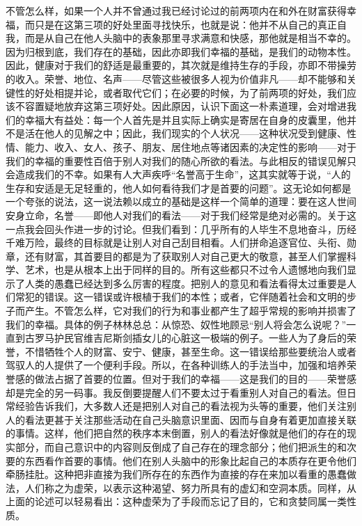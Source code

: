 \documentclass[12pt,oneside]{book}
\begin{document}
不管怎么样，如果一个人并不曾通过我已经讨论过的前两项内在和外在财富获得幸福，而只是在这第三项的好处里面寻找快乐，也就是说：他并不从自己的真正自我，而是从自己在他人头脑中的表象那里寻求满意和快感，那他就是相当不幸的。因为归根到底，我们存在的基础，因此亦即我们幸福的基础，是我们的动物本性。因此，健康对于我们的舒适是最重要的，其次就是维持生存的手段，亦即不带操劳的收入。荣誉、地位、名声——尽管这些被很多人视为价值非凡——却不能够和关键性的好处相提并论，或者取代它们；在必要的时候，为了前两项的好处，我们应该不容置疑地放弃这第三项好处。因此原因，认识下面这一朴素道理，会对增进我们的幸福大有益处：每一个人首先是并且实际上确实是寄居在自身的皮囊里，他并不是活在他人的见解之中；因此，我们现实的个人状况——这种状况受到健康、性情、能力、收入、女人、孩子、朋友、居住地点等诸因素的决定性的影响——对于我们的幸福的重要性百倍于别人对我们的随心所欲的看法。与此相反的错误见解只会造成我们的不幸。如果有人大声疾呼“名誉高于生命”，这其实就等于说，“人的生存和安适是无足轻重的，他人如何看待我们才是首要的问题”。这无论如何都是一个夸张的说法，这一说法赖以成立的基础是这样一个简单的道理：要在这人世间安身立命，名誉——即他人对我们的看法——对于我们经常是绝对必需的。关于这一点我会回头作进一步的讨论。但我们看到：几乎所有的人毕生不息地奋斗，历经千难万险，最终的目标就是让别人对自己刮目相看。人们拼命追逐官位、头衔、勋章，还有财富，其首要目的都是为了获取别人对自己更大的敬意，甚至人们掌握科学、艺术，也是从根本上出于同样的目的。所有这些都只不过令人遗憾地向我们显示了人类的愚蠢已经达到多么厉害的程度。把别人的意见和看法看得太过重要是人们常犯的错误。这一错误或许根植于我们的本性；或者，它伴随着社会和文明的步子而产生。不管怎么样，它对我们的行为和事业都产生了超乎常规的影响并损害了我们的幸福。具体的例子林林总总：从惊恐、奴性地顾忌“别人将会怎么说呢？”一直到古罗马护民官维吉尼斯剑插女儿的心脏这一极端的例子。一些人为了身后的荣誉，不惜牺牲个人的财富、安宁、健康，甚至生命。这一错误给那些要统治人或者驾驭人的人提供了一个便利手段。所以，在各种训练人的手法当中，加强和培养荣誉感的做法占据了首要的位置。但对于我们的幸福——这是我们的目的——荣誉感却是完全的另一码事。我反倒要提醒人们不要太过于看重别人对自己的看法。但日常经验告诉我们，大多数人还是把别人对自己的看法视为头等的重要，他们关注别人的看法更甚于关注那些活动在自己头脑意识里面、因而与自身有着更加直接关联的事情。这样，他们把自然的秩序本末倒置，别人的看法好像就是他们的存在的现实部分，而自己意识中的内容则反倒成了自己存在的理念部分；他们把派生的和次要的东西看作首要的事情。他们在别人头脑中的形象比起自己的本质存在更令他们牵肠挂肚。这种把非直接为我们所存在的东西作为直接的存在来加以看重的愚蠢做法，人们称之为虚荣，以表示这种渴望、努力所具有的虚幻和空洞本质。同样，从上面的论述可以轻易看出：这种虚荣为了手段而忘记了目的，它和贪婪同属一类性质。 
\end{document}
